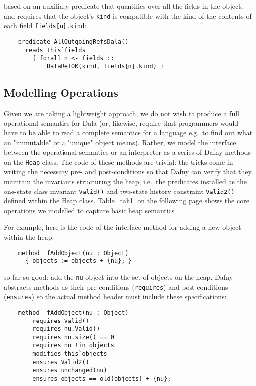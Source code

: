 \noindent based on an auxiliary predicate that quantifies over all the fields in the object, and requires that the object's \lstinline+kind+ is compatible with the kind of the contents of each field \lstinline+fields[n].kind+:

\begin{lstlisting}
    predicate AllOutgoingRefsDala()
      reads this`fields
        { forall n <- fields ::
            DalaRefOK(kind, fields[n].kind) }
\end{lstlisting}



\subsection{Modelling Operations}

Given we are taking a lightweight approach, we do not wish to produce a full operational semantics for Dala
(or, likewise, require that programmers would have to be able to read a complete semantics for a language e.g.\ to find out what an "immutable" or a "unique" object means).  Rather, we model the interface between the operational semantics or an interpreter as a series of Dafny methods on the \lstinline+Heap+ class. The code of these methods are trivial: the tricks come in writing the necessary pre- and post-conditions so that Dafny can verify that they maintain the invariants structuring the heap, i.e.\ the predicates installed as the one-state class invariant \lstinline+Valid()+  and two-state history constraint \lstinline+Valid2()+ defined within the Heap class.
Table~\ref{tab1} on the following page shows the core operations we modelled to capture basic heap semantics


For example, here is the code of the interface method for adding a new object within the heap:

\begin{lstlisting}
    method  fAddObject(nu : Object)
      { objects := objects + {nu}; }
\end{lstlisting}

\noindent so far so good: add the \lstinline+nu+ object into the set of objects on the heap. Dafny abstracts methods as their pre-conditions (\lstinline+requires+) and post-conditions (\lstinline+ensures+) so the actual method header must include these specifications:

\begin{lstlisting}
    method  fAddObject(nu : Object)
        requires Valid()
        requires nu.Valid()
        requires nu.size() == 0
        requires nu !in objects
        modifies this`objects
        ensures Valid2()
        ensures unchanged(nu)
        ensures objects == old(objects) + {nu};
\end{lstlisting}

